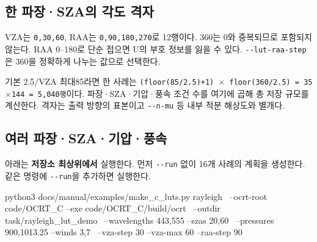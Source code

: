 \subsection{한 파장·SZA의 각도 격자}
\label{sec:auto:04_examples:3.2}

\par\noindent\begin{minipage}{\linewidth}
\end{minipage}\par

VZA는 \texttt{0,\allowbreak{}30,\allowbreak{}60\textdegree{}}, RAA는 \texttt{0,\allowbreak{}90,\allowbreak{}180,\allowbreak{}270\textdegree{}}로 12행이다. 360\textdegree{}는 0\textdegree{}와 중복되므로 포함되지 않는다. RAA 0--180\textdegree{}로 단순 접으면 U의 부호 정보를 잃을 수 있다. \texttt{-\allowbreak{}-\allowbreak{}lut-\allowbreak{}raa-\allowbreak{}step}은 360을 정확하게 나누는 값으로 선택한다.

기본 2.5\textdegree{}/VZA 최대85\textdegree{}라면 한 사례는 \texttt{(floor(85/\allowbreak{}2.\allowbreak{}5)+1) \ensuremath{\times} floor(36\allowbreak{}0/\allowbreak{}2.\allowbreak{}5) =\allowbreak{} 35\ensuremath{\times}144 =\allowbreak{} 5,\allowbreak{}040행}이다. 파장·SZA·기압·풍속 조건 수를 여기에 곱해 총 저장 규모를 계산한다. 격자는 출력 방향의 표본이고 \texttt{-\allowbreak{}-\allowbreak{}n-\allowbreak{}mu} 등 내부 적분 해상도와 별개다.

\subsection{여러 파장·SZA·기압·풍속}
\label{sec:auto:04_examples:3.3}
아래는 \textbf{저장소 최상위에서} 실행한다. 먼저 \texttt{-\allowbreak{}-\allowbreak{}run} 없이 16개 사례의 계획을 생성한다. 같은 명령에 \texttt{-\allowbreak{}-\allowbreak{}run}을 추가하면 실행한다.


\par\noindent\begin{minipage}{\linewidth}
\begin{ManualCode}
python3 docs/manual/examples/make_c_luts.py rayleigh \
  --ocrt-root code/OCRT_C --exe code/OCRT_C/build/ocrt \
  --outdir task/rayleigh_lut_demo \
  --wavelengths 443,555 --szas 20,60 \
  --pressures 900,1013.25 --winds 3,7 \
  --vza-step 30 --vza-max 60 --raa-step 90
\end{ManualCode}
\end{minipage}\par

